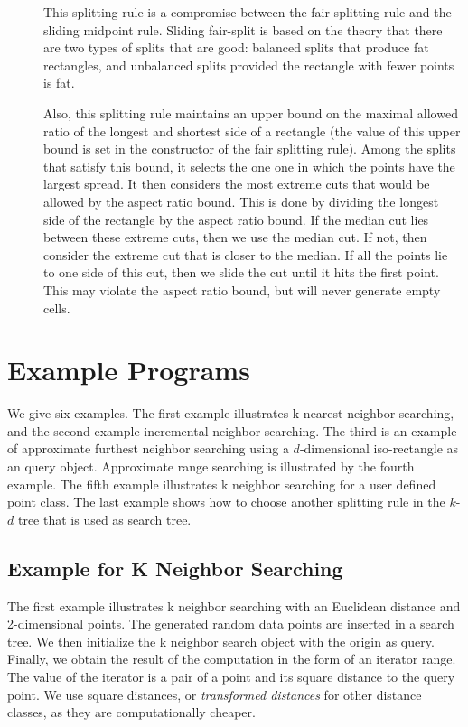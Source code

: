\begin{description}
\item[ ]

This splitting rule is a compromise between the fair splitting rule
and the sliding midpoint rule.  Sliding fair-split is based on the
theory that there are two types of splits that are good: balanced
splits that produce fat rectangles, and unbalanced splits provided the
rectangle with fewer points is fat.

Also, this splitting rule maintains an upper bound on the maximal
allowed ratio of the longest and shortest side of a rectangle (the
value of this upper bound is set in the constructor of the fair
splitting rule). Among the splits that satisfy this bound, it selects
the one one in which the points have the largest spread.  It then
considers the most extreme cuts that would be allowed by the aspect
ratio bound. This is done by dividing the longest side of the
rectangle by the aspect ratio bound. If the median cut lies between
these extreme cuts, then we use the median cut. If not, then consider
the extreme cut that is closer to the median.  If all the points lie
to one side of this cut, then we slide the cut until it hits the first
point.  This may violate the aspect ratio bound, but will never
generate empty cells.

\end{description}




\section{Example Programs}

We give six examples.  The first example illustrates k nearest neighbor
searching, and the second example incremental neighbor searching. 
The third is an example of approximate furthest neighbor searching
using a $d$-dimensional iso-rectangle as an query object.  Approximate
range searching is illustrated by the fourth example.  The fifth
example illustrates k neighbor searching for a user defined point
class. The last example shows how to choose another splitting rule in the
$k$-$d$ tree that is used as search tree.

\newpage
\subsection{Example for K Neighbor Searching}

The first example illustrates k neighbor searching with an Euclidean
distance and 2-dimensional points. The generated random
data points are inserted in a search tree. We then initialize
the k neighbor search object with the origin as query. Finally, we 
obtain the result of the computation in the form of an iterator
range. The value of the iterator is a pair of a point and its square
distance to the query point. We use square distances, or {\em
transformed distances} for other distance classes, as they are 
computationally cheaper.

